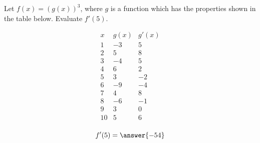 \documentclass{ximera}
\author{Steven Gubkin}
\begin{document}
\begin{exercise}


Let $f(x) = \left(g(x)\right)^3$, where $g$ is a function which has the properties shown in the table below.  Evaluate $f'(5)$.

\[
\begin{array}{c|c|c}
 x & g(x) & g'(x)\\ \hline
1 & -3 & 5\\
2 & 5 & 8\\
3 & -4 & 5\\
4 & 6 & 2\\
5 & 3 & -2\\
6 & -9 & -4\\
7 & 4 & 8\\
8 & -6 & -1\\
9 & 3 & 0\\
10 & 5 & 6\\
\end{array}
\]

\begin{prompt}
	$$f'(5) = \answer{-54}$$
\end{prompt}


\end{exercise}
\end{document}
